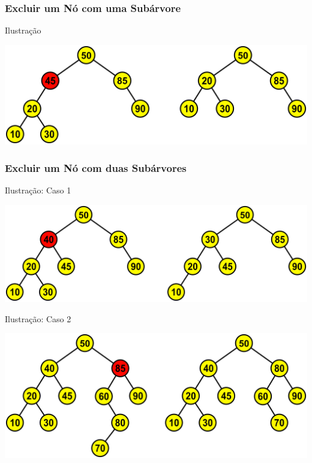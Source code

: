 \documentclass{beamer}
\begin{document}
\begin{frame}
\frametitle{Excluir um Nó com uma Subárvore}

\begin{exampleblock}{Ilustração}
	\begin{center}
		\includegraphics[scale=0.5]{img/arvore-excluir-uma-subarvore.png}
	\end{center}
\end{exampleblock}
\end{frame}

\begin{frame}
\frametitle{Excluir um Nó com duas Subárvores}

\begin{exampleblock}{Ilustração: Caso 1}
	\begin{center}
		\includegraphics[scale=0.4]{img/arvore-excluir-duas-subarvores-caso1.png}
	\end{center}
\end{exampleblock}\vfill

\begin{exampleblock}{Ilustração: Caso 2}
	\begin{center}
		\includegraphics[scale=0.4]{img/arvore-excluir-duas-subarvores-caso2.png}
	\end{center}
\end{exampleblock}
\end{frame}
\end{document}
